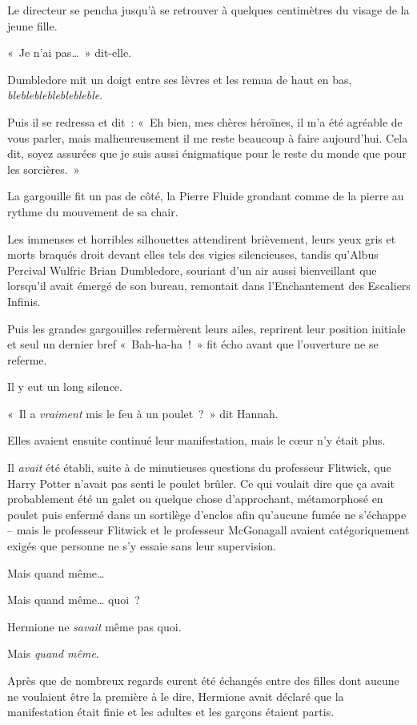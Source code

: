 Le directeur se pencha jusqu'à se retrouver à quelques centimètres du visage de la jeune fille.

«~Je n'ai pas…~» dit-elle.

Dumbledore mit un doigt entre ses lèvres et les remua de haut en bas, \emph{blebleblebleblebleble}.

Puis il se redressa et dit~: «~Eh bien, mes chères héroïnes, il m'a été agréable de vous parler, mais malheureusement il me reste beaucoup à faire aujourd'hui. Cela dit, soyez assurées que je suis aussi énigmatique pour le reste du monde que pour les sorcières.~»

La gargouille fit un pas de côté, la Pierre Fluide grondant comme de la pierre au rythme du mouvement de sa chair.

Les immenses et horribles silhouettes attendirent brièvement, leurs yeux gris et morts braqués droit devant elles tels des vigies silencieuses, tandis qu'Albus Percival Wulfric Brian Dumbledore, souriant d'un air aussi bienveillant que lorsqu'il avait émergé de son bureau, remontait dans l'Enchantement des Escaliers Infinis.

Puis les grandes gargouilles refermèrent leurs ailes, reprirent leur position initiale et seul un dernier bref «~Bah-ha-ha~!~» fit écho avant que l'ouverture ne se referme.

Il y eut un long silence.

«~Il a \emph{vraiment} mis le feu à un poulet~?~» dit Hannah.

\later

Elles avaient ensuite continué leur manifestation, mais le cœur n'y était plus.

Il \emph{avait} été établi, suite à de minutieuses questions du professeur Flitwick, que Harry Potter n'avait pas senti le poulet brûler. Ce qui voulait dire que ça avait probablement été un galet ou quelque chose d'approchant, métamorphosé en poulet puis enfermé dans un sortilège d'enclos afin qu'aucune fumée ne s'échappe -- mais le professeur Flitwick et le professeur McGonagall avaient catégoriquement exigés que personne ne s'y essaie sans leur supervision.

Mais quand même…

Mais quand même… quoi~?

Hermione ne \emph{savait} même pas quoi.

Mais \emph{quand même}.

Après que de nombreux regards eurent été échangés entre des filles dont aucune ne voulaient être la première à le dire, Hermione avait déclaré que la manifestation était finie et les adultes et les garçons étaient partis.

